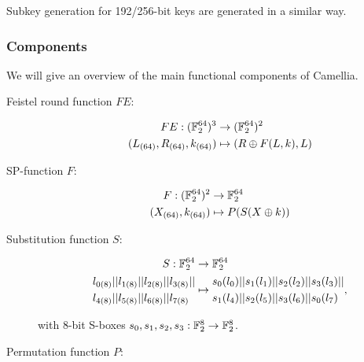 Subkey generation for 192/256-bit keys are generated in a similar way.

\subsubsection{Components}

We will give an overview of the main functional components of Camellia.

\begin{description}
\item[Feistel round function $FE$:]

\begin{align*}
    FE:(\mathbb{F}_2^{64})^3 &\rightarrow (\mathbb{F}_2^{64})^2 \\
    (L_{(64)},R_{(64)},k_{(64)})&\mapsto (R\oplus F(L,k), L)
\end{align*}

\item[SP-function $F$:]

\begin{align*}
    F:(\mathbb{F}_2^{64})^2 &\rightarrow \mathbb{F}_2^{64} \\
    (X_{(64)},k_{(64)})&\mapsto P(S(X\oplus k))
\end{align*}

\item[Substitution function $S$:]

\begin{align*}
    S:\mathbb{F}_2^{64} &\rightarrow \mathbb{F}_2^{64} \\
    \begin{aligned}
        l_{0(8)}||l_{1(8)}||l_{2(8)}||l_{3(8)}&||\\
        l_{4(8)}||l_{5(8)}||l_{6(8)}||l_{7(8)}&
    \end{aligned}&\mapsto
    \begin{aligned}
        s_0(l_0)||s_1(l_1)||s_2(l_2)||s_3(l_3)&||\\
        s_1(l_4)||s_2(l_5)||s_3(l_6)||s_0(l_7)&
    \end{aligned},
\end{align*}

with 8-bit S-boxes $s_0,s_1,s_2,s_3:\mathbb{F}_2^{8}\rightarrow \mathbb{F}_2^{8}$.

\item[Permutation function $P$:]


\end{description}
